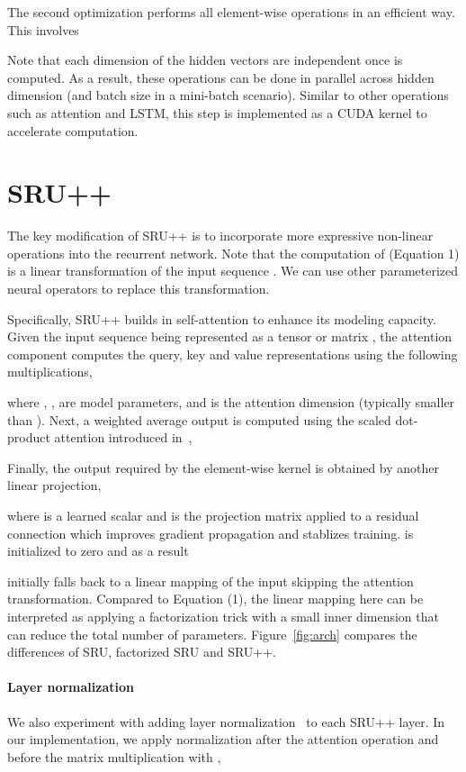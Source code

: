 \documentclass[11pt,a4paper]{article}
\begin{document}
The second optimization performs all element-wise operations in an efficient way.
This involves

Note that each dimension of the hidden vectors are independent once  is computed. 
As a result, these operations can be done in parallel across hidden dimension  (and batch size  in a mini-batch scenario).
Similar to other operations such as attention and LSTM, this step is implemented as a CUDA kernel to accelerate computation.





\section{SRU++}
The key modification of SRU++ is to incorporate more expressive non-linear operations into the recurrent network.
Note that the computation of  (Equation 1) is a linear transformation of the input sequence .
We can use other parameterized neural operators to replace this transformation.

Specifically, SRU++ builds in self-attention to enhance its modeling capacity.
Given the input sequence being represented as a tensor or matrix , the attention component computes the query, key and value representations using the following multiplications,

where , ,  are model parameters, and  is the attention dimension (typically smaller than ).
Next, a weighted average output  is computed using the scaled dot-product attention introduced in~\citet{vaswani2017attention},

Finally, the output  required by the element-wise kernel is obtained by another linear projection,

where  is a learned scalar and  is the projection matrix applied to a residual connection  which improves gradient propagation and stablizes training.
 is initialized to zero and as a result

initially falls back to a linear mapping of the input  skipping the attention transformation.
Compared to Equation (1), the linear mapping here can be interpreted as applying a factorization trick  with a small inner dimension  that can reduce the total number of parameters.
Figure~\ref{fig:arch} compares the differences of SRU, factorized SRU and SRU++.






\paragraph{Layer normalization}
We also experiment with adding layer normalization~\cite{ba2016layer} to each SRU++ layer. 
In our implementation, we apply normalization after the attention operation and before the matrix multiplication with ,
\end{document}
